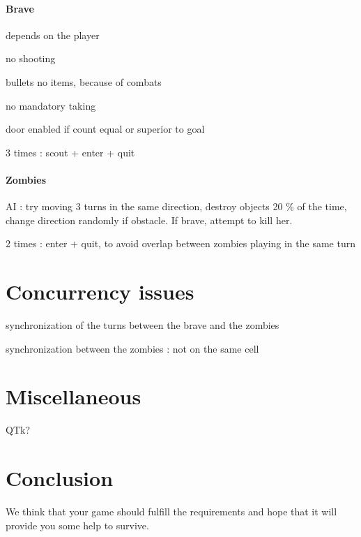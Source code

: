 \documentclass[11pt,a4paper]{article}
\begin{document}
\paragraph{Brave}
depends on the player

no shooting

bullets no items, because of combats

no mandatory taking

door enabled if count equal or superior to goal

3 times : scout + enter + quit

\paragraph{Zombies}
AI : try moving 3 turns in the same direction, destroy objects 20 \% of the time, change direction randomly if obstacle. If brave, attempt to kill her.

2 times : enter + quit, to avoid overlap between zombies playing in the same turn


\section{Concurrency issues}
synchronization of the turns between the brave and the zombies

synchronization between the zombies : not on the same cell


\section{Miscellaneous}
QTk?

    
\section*{Conclusion}
We think that your game should fulfill the requirements and hope that it will provide you some help to survive.
    
\end{document}
